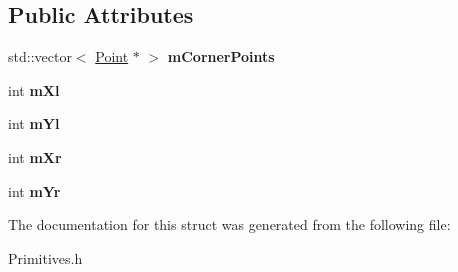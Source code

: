 \subsection*{Public Attributes}
\begin{DoxyCompactItemize}
\item 
\mbox{\label{structRectangle_aab16fa89eb9ab46d69dd6cefcb367a13}} 
std\+::vector$<$ \hyperlink{structPoint}{Point} $\ast$ $>$ {\bfseries m\+Corner\+Points}
\item 
\mbox{\label{structRectangle_a87c944bf4e21793fa46ca5a06c2e09f8}} 
int {\bfseries m\+Xl}
\item 
\mbox{\label{structRectangle_a187ffc864e8d9799077cd74052bda9d5}} 
int {\bfseries m\+Yl}
\item 
\mbox{\label{structRectangle_ac00e1c51a17a533ac2e82c6a80ef4405}} 
int {\bfseries m\+Xr}
\item 
\mbox{\label{structRectangle_a044a4c391bfa2eaf81a546387fee9125}} 
int {\bfseries m\+Yr}
\end{DoxyCompactItemize}


The documentation for this struct was generated from the following file\+:\begin{DoxyCompactItemize}
\item 
Primitives.\+h\end{DoxyCompactItemize}
